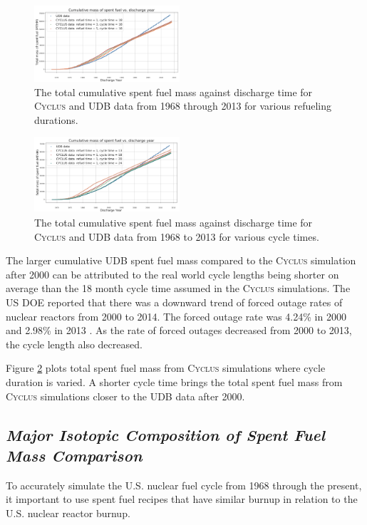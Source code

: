 \documentclass{anstrans}
\newcommand{\Cyclus}{\textsc{Cyclus}\xspace}%
\begin{document}
\begin{figure}[t] 
	\centering
	\includegraphics[width=0.48\textwidth]{figures/total_cumulative_mass_spent_fuel_refueltime}
	\caption{The total cumulative spent fuel mass against discharge time for \Cyclus and \gls{UDB} data from 1968 through 2013 for various refueling durations.}
	\label{fig:total_refueltime}
\end{figure} 

\begin{figure}[b] %
	\centering
	\includegraphics[width=0.48\textwidth]{figures/total_cumulative_mass_spent_fuel_cycletime}
	\caption{The total cumulative spent fuel mass against discharge time for \Cyclus and \gls{UDB} data from 1968 to 2013 for various cycle times.}
	\label{fig:total_cycletime}
\end{figure} 

The larger cumulative \gls{UDB} spent fuel mass compared to the \Cyclus simulation 
after 2000 can be attributed to the real world cycle lengths being shorter on 
average than the 18 month cycle time assumed in the  \Cyclus simulations. The 
\gls{US} \gls{DOE} reported that there was a downward trend of forced outage 
rates of nuclear reactors from 2000 to 2014. The forced outage rate was 4.24\% 
in 2000 and 2.98\% in 2013 \cite{gehin_nuclear_2016}. As the rate of forced 
outages decreased from 2000 to 2013, the cycle length also decreased. 

Figure \ref{fig:total_cycletime} plots total spent fuel mass from 
\Cyclus simulations where cycle duration is varied. A shorter cycle time brings the 
total spent fuel mass from \Cyclus simulations closer to the \gls{UDB} data after 
2000. 

\subsection{\textit{Major Isotopic Composition of  Spent Fuel Mass Comparison}}
To accurately simulate the U.S. nuclear fuel cycle from 1968 through the present, 
it important to use spent fuel recipes that have similar burnup in relation to 
the U.S. nuclear reactor burnup. 
\end{document}

